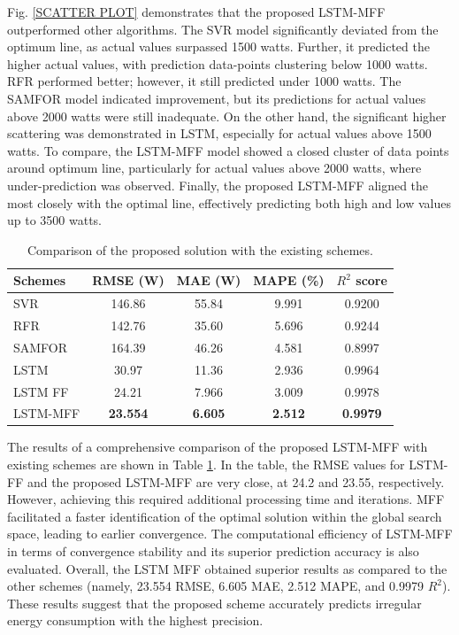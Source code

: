 \documentclass[journal]{IEEEtran}
\begin{document}
   Fig. \ref{SCATTER PLOT} demonstrates that the proposed LSTM-MFF outperformed other algorithms. The SVR model significantly deviated from the optimum line, as actual values surpassed 1500 watts. Further, it predicted the higher actual values, with prediction data-points clustering below 1000 watts. RFR performed better; however, it still predicted under 1000 watts. The SAMFOR model indicated improvement, but its predictions for actual values above 2000 watts were still inadequate. On the other hand, the significant higher scattering was demonstrated in LSTM, especially for actual values above 1500 watts. To compare, the LSTM-MFF model showed a closed cluster of data points around optimum line, particularly for actual values above 2000 watts, where under-prediction was observed. Finally, the proposed LSTM-MFF aligned the most closely with the optimal line, effectively predicting both high and low values up to 3500 watts.

\begin{table}[!h]
    \centering
    \caption{\centering Comparison of the proposed solution with the existing schemes.}
    \label{Results per hour}
    \begin{tabular}{lcccc}
    \rowcolor[HTML]{C0C0C0}
        \hline
    \textbf{Schemes}  & \textbf{RMSE (W)} & \textbf{MAE (W)} & \textbf{MAPE} (\%) & \textbf{$R^2$ score}\\
        \hline
        SVR & 146.86 & 55.84 & 9.991 & 0.9200\\
        RFR & 142.76 & 35.60 & 5.696 & 0.9244 \\
        SAMFOR & 164.39 & 46.26 & 4.581 & 0.8997\\
        LSTM & 30.97 & 11.36 & 2.936 & 0.9964\\
        LSTM FF & 24.21 & 7.966 & 3.009 &0.9978\\
        LSTM-MFF & \textbf{23.554} & \textbf{6.605} & \textbf{2.512} &\textbf{0.9979}\\
        \hline
    \end{tabular}
\end{table}


The results of a comprehensive comparison of the proposed LSTM-MFF with existing schemes are shown in Table \ref{Results per hour}. In the table, the RMSE values for LSTM-FF and the proposed LSTM-MFF are very close, at 24.2 and 23.55, respectively. However, achieving this required additional processing time and iterations. MFF facilitated a faster identification of the optimal solution within the global search space, leading to earlier convergence. The computational efficiency of LSTM-MFF in terms of convergence stability and its superior prediction accuracy is also evaluated. Overall, the LSTM MFF obtained superior results as compared to the other schemes (namely, 23.554 RMSE, 6.605 MAE, 2.512 MAPE, and 0.9979 $R^2$). These results suggest that the proposed scheme accurately predicts irregular energy consumption with the highest precision.
\end{document}

